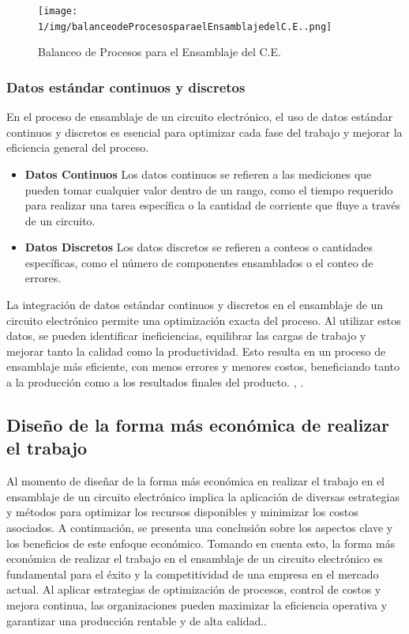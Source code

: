     \begin{figure}[H]
        \centering
        \texttt{[image: 1/img/balanceodeProcesosparaelEnsamblajedelC.E..png]}
        \caption{Balanceo de Procesos para el Ensamblaje del C.E.}
    \end{figure}
    
    \subsubsection{Datos estándar continuos y discretos}
    En el proceso de ensamblaje de un circuito electrónico, el uso de datos estándar continuos y discretos es esencial para optimizar cada fase del trabajo y mejorar la eficiencia general del proceso.
    
    \begin{itemize}
        \item \textbf{Datos Continuos}
    Los datos continuos se refieren a las mediciones que pueden tomar cualquier valor dentro de un rango, como el tiempo requerido para realizar una tarea específica o la cantidad de corriente que fluye a través de un circuito.
    \item \textbf{Datos Discretos}
    Los datos discretos se refieren a conteos o cantidades específicas, como el número de componentes ensamblados o el conteo de errores.
    
    \end{itemize}
    La integración de datos estándar continuos y discretos en el ensamblaje de un circuito electrónico permite una optimización exacta del proceso. Al utilizar estos datos, se pueden identificar ineficiencias, equilibrar las cargas de trabajo y mejorar tanto la calidad como la productividad. Esto resulta en un proceso de ensamblaje más eficiente, con menos errores y menores costos, beneficiando tanto a la producción como a los resultados finales del producto.
    \cite{Groover}, \cite{Niebel2}.
    \subsection{Diseño de la forma más económica de realizar el trabajo}
    Al momento de diseñar de la forma más económica en realizar el trabajo en el ensamblaje de un circuito electrónico implica la aplicación de diversas estrategias y métodos para optimizar los recursos disponibles y minimizar los costos asociados. A continuación, se presenta una conclusión sobre los aspectos clave y los beneficios de este enfoque económico.
    Tomando en cuenta esto, la forma más económica de realizar el trabajo en el ensamblaje de un circuito electrónico es fundamental para el éxito y la competitividad de una empresa en el mercado actual. Al aplicar estrategias de optimización de procesos, control de costos y mejora continua, las organizaciones pueden maximizar la eficiencia operativa y garantizar una producción rentable y de alta calidad.\cite{Mashuca}.
